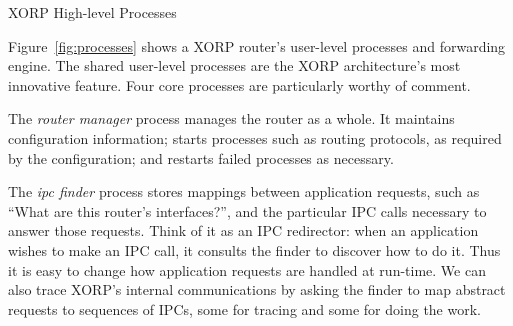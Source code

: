
\begin{floatingfigure}[l]{3.0in} %
\centerline{}
\caption{XORP High-level Processes}
\label{fig:processes}
\vspace{-0.1in}
\end{floatingfigure}

Figure~\ref{fig:processes} shows a XORP router's user-level processes
and forwarding engine.
The shared user-level processes are the XORP architecture's most innovative
feature. Four core processes are particularly worthy of comment.

The \emph{router manager}
process manages the router as a whole.  It maintains
configuration information; starts processes such as routing
protocols, as required by the configuration; and restarts failed
processes as necessary.

The \emph{ipc finder} process stores mappings between application
requests, such as ``What are this router's interfaces?'', and the
particular IPC calls necessary to answer those requests.
Think of it as an IPC redirector:
when an application wishes to make an IPC
call, it consults the finder to discover how to do it.  Thus it is easy to change
how application requests are handled at run-time.  We
can also trace XORP's internal communications by asking the finder to map
abstract requests to sequences of IPCs, some for tracing and some for
doing the work.  


